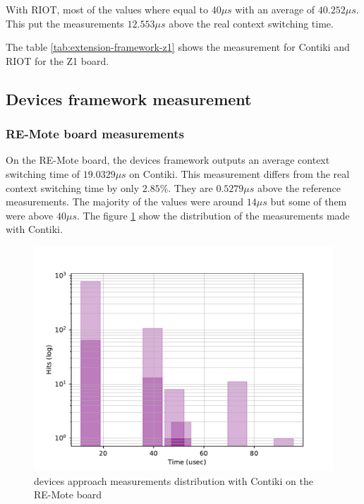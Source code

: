 With RIOT, most of the values where equal to $40 \mu s$ with an average of $40.252\mu s$.
This put the measurements $12.553\mu s$ above the real context switching time.

The table \ref{tab:extension-framework-z1} shows the measurement for Contiki and RIOT for the Z1 board.



\subsection{Devices framework measurement}

\subsubsection{RE-Mote board measurements}
On the RE-Mote board, the devices framework outputs an average context switching time of $19.0329\mu s$ on Contiki.
This measurement differs from the real context switching time by only $2.85\%$.
They are $0.5279\mu s$ above the reference measurements.
The majority of the values were around $14\mu s$ but some of them were above $40\mu s$.
The figure \ref{fig:devices-framework-contiki-remote} show the distribution of the measurements made with Contiki.

\begin{figure}[!ht]
      \centering
      \includegraphics[scale=.7]{assets/devices-framework-contiki-remote.pdf}
      \caption{devices approach measurements distribution with Contiki on the RE-Mote board\label{fig:devices-framework-contiki-remote}}
\end{figure}

